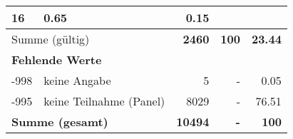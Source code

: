 \begin{longtable}{lXrrr}
       \num{16} &
       \num[round-mode=places,round-precision=2]{0,65} &
         \num[round-mode=places,round-precision=2]{0,15} \\
     \midrule
     \multicolumn{2}{l}{Summe (gültig)} &
       \textbf{\num{2460}} &
     \textbf{100} &
       \textbf{\num[round-mode=places,round-precision=2]{23,44}} \\
     \multicolumn{5}{l}{\textbf{Fehlende Werte}}\\
       -998 &
       keine Angabe &
         \num{5} &
        - &
         \num[round-mode=places,round-precision=2]{0,05} \\
       -995 &
       keine Teilnahme (Panel) &
         \num{8029} &
        - &
         \num[round-mode=places,round-precision=2]{76,51} \\
     \midrule
     \multicolumn{2}{l}{\textbf{Summe (gesamt)}} &
          \textbf{\num{10494}} &
        \textbf{-} &
        \textbf{100} \\
     \bottomrule
     \end{longtable}
     
